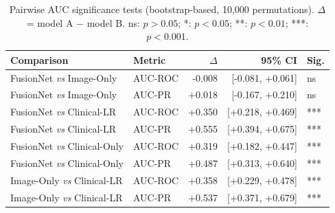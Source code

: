 \begin{table}[ht]
\centering
\caption{Pairwise AUC significance tests (bootstrap-based, 10{,}000 permutations). $\Delta$ = model A $-$ model B. ns: $p>0.05$; *: $p<0.05$; **: $p<0.01$; ***: $p<0.001$.}
\label{tab:stats}
\begin{tabular}{llrrl}
\hline
\textbf{Comparison} & \textbf{Metric} & $\Delta$ & \textbf{95\% CI} & \textbf{Sig.} \\
\hline
  FusionNet \textit{vs} Image-Only & AUC-ROC & -0.008 & [-0.081, +0.061] & ns \\
  FusionNet \textit{vs} Image-Only & AUC-PR & +0.018 & [-0.167, +0.210] & ns \\
  FusionNet \textit{vs} Clinical-LR & AUC-ROC & +0.350 & [+0.218, +0.469] & *** \\
  FusionNet \textit{vs} Clinical-LR & AUC-PR & +0.555 & [+0.394, +0.675] & *** \\
  FusionNet \textit{vs} Clinical-Only & AUC-ROC & +0.319 & [+0.182, +0.447] & *** \\
  FusionNet \textit{vs} Clinical-Only & AUC-PR & +0.487 & [+0.313, +0.640] & *** \\
  Image-Only \textit{vs} Clinical-LR & AUC-ROC & +0.358 & [+0.229, +0.478] & *** \\
  Image-Only \textit{vs} Clinical-LR & AUC-PR & +0.537 & [+0.371, +0.679] & *** \\
\hline
\end{tabular}
\end{table}